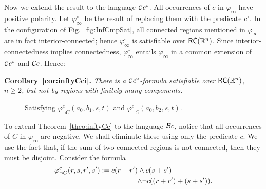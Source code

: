 \documentclass{article}
\newcommand{\ic}{c^\circ}
\newcommand{\R}{\mathbb{R}}
\newcommand{\RC}{{\sf RC}}
\newcommand{\ti}[2][]{{#2}^{\circ_{#1}}}
\newenvironment{swetheorem}[1]{\par\medskip\noindent\textbf{#1.}\hspace*{0.5em}\em}{\par\smallskip}
\renewcommand{\phi}{\varphi}
\begin{document}
Now we extend the result to the language $\mathcal{C}c^\circ$. All occurrences of
$c$ in $\phi_\infty$ have positive polarity.  Let $\ti{\phi}_\infty$
be the result of replacing them with the predicate $\ic$. In the
configuration of Fig.~\ref{fig:InfCmpSat}, all connected regions
mentioned in $\phi_\infty$ are in fact interior-connected; hence
$\ti{\phi}_\infty$ is satisfiable over $\RC(\R^n)$. Since
interior-connectedness implies connectedness, $\ti{\phi}_\infty$
entails $\phi_\infty$ in a common extension of $\mathcal{C}c^\circ$ and
$\mathcal{C}c$. Hence:
\begin{swetheorem}{Corollary~\ref{cor:inftyCci}}
There is a $\mathcal{C}c^\circ$-formula satisfiable over $\RC(\R^n)$, $n \geq 2$,
but not by regions with finitely many components.
\end{swetheorem}
\begin{figure}[h]
\begin{center}
\end{center}
	\caption{Satisfying $\phi_{\lnot C}^c(a_0, b_1,s,t)$ and $\phi_{\lnot C}^c(a_0, b_2,s,t)$.}
	\label{fig:InfCmpElAiBi}	
\end{figure}
To extend Theorem~\ref{theo:inftyCc} to the language $\mathcal{B}c$, 
notice that all occurrences of $C$ in $\phi_\infty$ are negative.
We shall eliminate these using only the predicate $c$. We use
the fact that, if the sum of two connected regions is not 
connected, then they must be disjoint. Consider the formula 
\begin{align*}
	\phi_{\lnot C}^c(r,s,r',s'):=c(r+r')\land c(s+s') \hspace{2cm}
		\\\hfill\land \lnot c((r+r')+(s+s')).
\end{align*}
\end{document}
